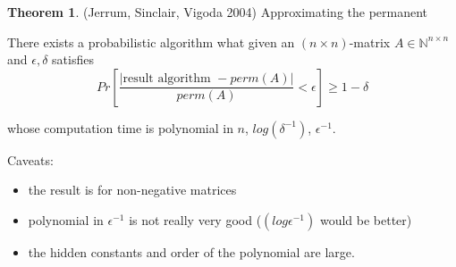 \documentclass[a4paper,12pt]{article}
\theoremstyle{definition}
\newtheorem{theorem}[counter]{Theorem}
\theoremstyle{remark}
\newcommand{\N}{\mathbb{N}}
\begin{document}
\begin{theorem}
    (Jerrum, Sinclair, Vigoda 2004) Approximating the permanent

    There exists a probabilistic algorithm what given an $(n \times n)$-matrix $A \in \N^{n \times n}$ 
    and $\epsilon, \delta$ satisfies 
    \begin{equation*}
        Pr [\frac{|\text{result algorithm } - perm(A)|}{perm(A)} < \epsilon] \geq 1 - \delta
    \end{equation*}

    whose computation time is polynomial in $n$, $log(\delta^{-1})$, $\epsilon^{-1}$.

    Caveats:
    \begin{itemize}
        \item the result is for non-negative matrices
        \item polynomial in $\epsilon^{-1}$ is not really very good ($(log \epsilon^{-1})$ would be better)
        \item the hidden constants and order of the polynomial are large.
    \end{itemize}
\end{theorem}
\end{document}
